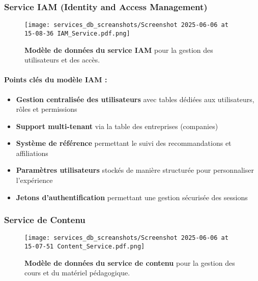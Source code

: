 \subsubsection{Service IAM (Identity and Access Management)}
\begin{figure}[h!]
  \centering
  \texttt{[image: services\_db\_screanshots/Screenshot 2025-06-06 at 15-08-36 IAM\_Service.pdf.png]}
  \caption{\textbf{Modèle de données du service IAM} pour la gestion des utilisateurs et des accès.}
  \label{fig:iam_service}
\end{figure}
\vspace{-10pt}
\small
\paragraph{Points clés du modèle IAM :}
\begin{itemize}[leftmargin=*,noitemsep,topsep=0pt]
  \item \textbf{Gestion centralisée des utilisateurs} avec tables dédiées aux utilisateurs, rôles et permissions
  \item \textbf{Support multi-tenant} via la table des entreprises (companies)
  \item \textbf{Système de référence} permettant le suivi des recommandations et affiliations
  \item \textbf{Paramètres utilisateurs} stockés de manière structurée pour personnaliser l'expérience
  \item \textbf{Jetons d'authentification} permettant une gestion sécurisée des sessions
\end{itemize}
\normalsize
\newpage

\subsubsection{Service de Contenu}
\begin{figure}[h!]
  \centering
  \texttt{[image: services\_db\_screanshots/Screenshot 2025-06-06 at 15-07-51 Content\_Service.pdf.png]}
  \caption{\textbf{Modèle de données du service de contenu} pour la gestion des cours et du matériel pédagogique.}
  \label{fig:content_service}
\end{figure}
\vspace{-10pt}
\small
